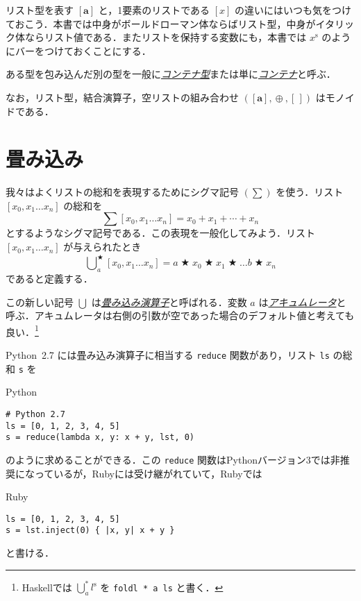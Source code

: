 \documentclass[a4paper,draft]{jsbook}
\newcommand{\programminglanguage}[1]{\textsf{#1}}
\newcommand{\haskell}{\programminglanguage{Haskell}}
\newcommand{\python}{\programminglanguage{Python}}
\newcommand{\ruby}{\programminglanguage{Ruby}}
\newcommand{\keyword}[1]{{\underline{\emph{#1}}}}
\newcommand{\code}[1]{\texttt{#1}}
\newenvironment{pythoncode}{\begin{itembox}[r]{\python}}{\end{itembox}}
\newenvironment{rubycode}{\begin{itembox}[r]{\ruby}}{\end{itembox}}
\newcommand{\mType}[1]{\mathbf{#1}}
\newcommand{\mListType}[1]{[\mType{#1}]}
\newcommand{\mEmptyList}{{[\,]}}
\newcommand{\mListOf}[1]{\left[#1\right]}
\newcommand{\mTupleOf}[1]{\left(#1\right)}
\newcommand{\mListVar}[1]{{#1}^\mathrm{s}}
\DeclareMathOperator{\mBinOp}{\bigstar}
\DeclareMathOperator*{\mFoldLeft}{\bigcup}
\DeclareMathOperator{\mAppend}{\oplus}
\begin{document}
リスト型を表す $\mListType{a}$ と，1要素のリストである $\mListOf{x}$ の違いにはいつも気をつけておこう．本書では中身がボールドローマン体ならばリスト型，中身がイタリック体ならリスト値である．またリストを保持する変数にも，本書では $\mListVar{x}$ のようにバーをつけておくことにする．

ある型を包み込んだ別の型を一般に\keyword{コンテナ型}または単に\keyword{コンテナ}と呼ぶ．

なお，リスト型，結合演算子，空リストの組み合わせ $\mTupleOf{\mListType{a},\mAppend,\mEmptyList}$ はモノイドである．

\section{畳み込み}

我々はよくリストの総和を表現するためにシグマ記号 $(\sum)$ を使う．リスト $\mListOf{x_0,x_1\dots x_n}$ の総和を
\begin{equation}
\sum\mListOf{x_0,x_1\dots x_n}=x_0+x_1+\dotsb+x_n
\end{equation}
とするようなシグマ記号である．この表現を一般化してみよう．リスト $\mListOf{x_0,x_1\dots x_n}$ が与えられたとき
\begin{equation}
\mFoldLeft^{\mBinOp}_{a}\mListOf{x_0,x_1\dots x_n}
=a\mBinOp x_0\mBinOp x_1\mBinOp\dots b\mBinOp x_n
\end{equation}
であると定義する．

この新しい記号 $\mFoldLeft$ は\keyword{畳み込み演算子}と呼ばれる．変数 $a$ は\keyword{アキュムレータ}と呼ぶ．アキュムレータは右側の引数が空であった場合のデフォルト値と考えても良い．\footnote{\haskell では $\mFoldLeft^{*}_a\mListVar{l}$ を \code{foldl * a ls} と書く．}

\python\ 2.7 には畳み込み演算子に相当する \code{reduce} 関数があり，リスト \code{ls} の総和 \code{s} を
\begin{pythoncode}
\begin{verbatim}
# Python 2.7
ls = [0, 1, 2, 3, 4, 5]
s = reduce(lambda x, y: x + y, lst, 0)
\end{verbatim}
\end{pythoncode}
のように求めることができる．この \code{reduce} 関数は\python バージョン3では非推奨になっているが，\ruby には受け継がれていて，\ruby では
\begin{rubycode}
\begin{verbatim}
ls = [0, 1, 2, 3, 4, 5]
s = lst.inject(0) { |x, y| x + y }
\end{verbatim}
\end{rubycode}
と書ける．
\end{document}
